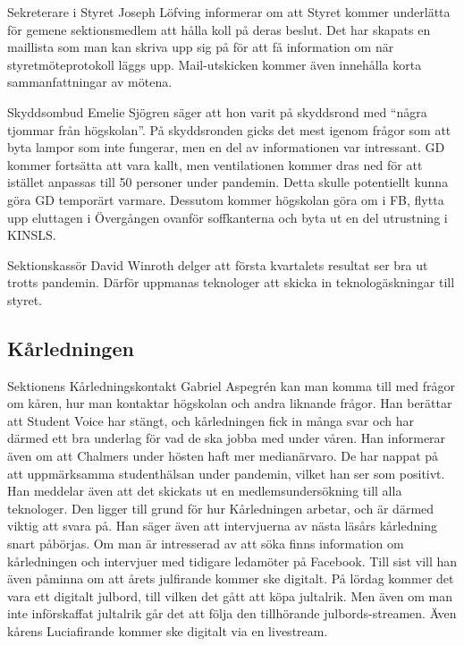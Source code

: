 \documentclass[hidelinks]{sektionsmote} %
\begin{document}
Sekreterare i Styret Joseph Löfving informerar om att Styret kommer underlätta för gemene sektionsmedlem att hålla koll på deras beslut.
Det har skapats en maillista som man kan skriva upp sig på för att få information om när styretmöteprotokoll läggs upp.
Mail-utskicken kommer även innehålla korta sammanfattningar av mötena.

Skyddsombud Emelie Sjögren säger att hon varit på skyddsrond med \enquote{några tjommar från högskolan}.
På skyddsronden gicks det mest igenom frågor som att byta lampor som inte fungerar, men en del av informationen var intressant.
GD kommer fortsätta att vara kallt, men ventilationen kommer dras ned för att istället anpassas till 50 personer under pandemin.
Detta skulle potentiellt kunna göra GD temporärt varmare.
Dessutom kommer högskolan göra om i FB, flytta upp eluttagen i Övergången ovanför soffkanterna och byta ut en del utrustning i KINSLS.

Sektionskassör David Winroth delger att första kvartalets resultat ser bra ut trotts pandemin.
Därför uppmanas teknologer att skicka in teknologäskningar till styret.

\subsection{Kårledningen}
Sektionens Kårledningskontakt Gabriel Aspegrén kan man komma till med frågor om kåren, hur man kontaktar högskolan och andra liknande frågor.
Han berättar att Student Voice har stängt, och kårledningen fick in många svar och har därmed ett bra underlag för vad de ska jobba med under våren.
Han informerar även om att Chalmers under hösten haft mer medianärvaro.
De har nappat på att uppmärksamma studenthälsan under pandemin, vilket han ser som positivt.
Han meddelar även att det skickats ut en medlemsundersökning till alla teknologer.
Den ligger till grund för hur Kårledningen arbetar, och är därmed viktig att svara på.
Han säger även att intervjuerna av nästa läsårs kårledning snart påbörjas.
Om man är intresserad av att söka finns information om kårledningen och intervjuer med tidigare ledamöter på Facebook.
Till sist vill han även påminna om att årets julfirande kommer ske digitalt.
På lördag kommer det vara ett digitalt julbord, till vilken det gått att köpa jultalrik.
Men även om man inte införskaffat jultalrik går det att följa den tillhörande julbords-streamen.
Även kårens Luciafirande kommer ske digitalt via en livestream.
\end{document}
